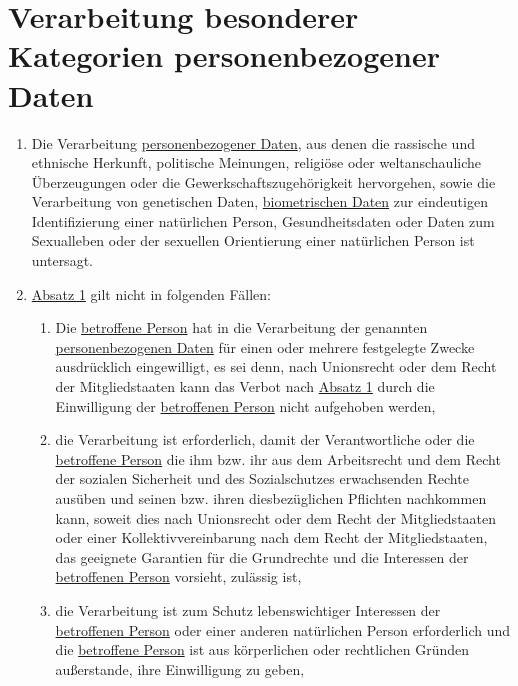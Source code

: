 \chapter{Verarbeitung besonderer Kategorien personenbezogener Daten}
\label{ch:9}


\begin{enumerate}

  \item Die Verarbeitung \hyperref[itm:04-1]{personenbezogener Daten}, aus denen die rassische und ethnische Herkunft, politische Meinungen,
   religiöse oder weltanschauliche Überzeugungen oder die Gewerkschaftszugehörigkeit hervorgehen, sowie die
   Verarbeitung von genetischen Daten, \hyperref[itm:04-14]{biometrischen Daten} zur eindeutigen Identifizierung einer natürlichen Person,
   Gesundheitsdaten oder Daten zum Sexualleben oder der sexuellen Orientierung einer natürlichen Person ist untersagt.
  \label{itm:09-1}

  \item \hyperref[itm:09-1]{Absatz 1} gilt nicht in folgenden Fällen:
  \label{itm:09-2}

  \begin{enumerate}
  
    \item Die \hyperref[itm:04-1]{betroffene Person} hat in die Verarbeitung der genannten \hyperref[itm:04-1]{personenbezogenen Daten} für einen oder mehrere
     festgelegte Zwecke ausdrücklich eingewilligt, es sei denn, nach Unionsrecht oder dem Recht der Mitgliedstaaten
     kann das Verbot nach \hyperref[itm:09-1]{Absatz 1} durch die Einwilligung der \hyperref[itm:04-1]{betroffenen Person} nicht aufgehoben
     werden,
    \label{itm:09-2a}

    \item die Verarbeitung ist erforderlich, damit der Verantwortliche oder die \hyperref[itm:04-1]{betroffene Person} die ihm bzw. ihr aus
     dem Arbeitsrecht und dem Recht der sozialen Sicherheit und des Sozialschutzes erwachsenden Rechte ausüben und
     seinen bzw. ihren diesbezüglichen Pflichten nachkommen kann, soweit dies nach Unionsrecht oder dem Recht der
     Mitgliedstaaten oder einer Kollektivvereinbarung nach dem Recht der Mitgliedstaaten, das geeignete Garantien für
     die Grundrechte und die Interessen der \hyperref[itm:04-1]{betroffenen Person} vorsieht, zulässig ist,
    \label{itm:09-2b}

    \item die Verarbeitung ist zum Schutz lebenswichtiger Interessen der \hyperref[itm:04-1]{betroffenen Person} oder einer anderen
     natürlichen Person erforderlich und die \hyperref[itm:04-1]{betroffene Person} ist aus körperlichen oder rechtlichen Gründen
     außerstande, ihre Einwilligung zu geben,
    \label{itm:09-2c}


\end{enumerate}
\end{enumerate}
